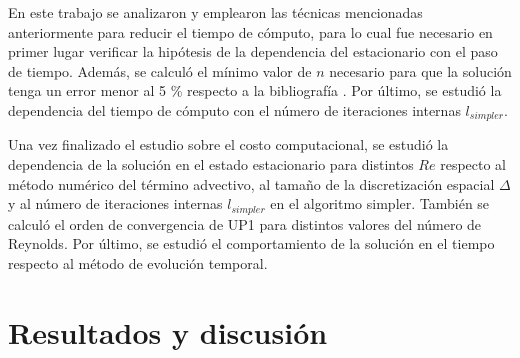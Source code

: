 \documentclass[aps,prb,twocolumn,superscriptaddress,floatfix,longbibliography,10pt]{revtex4-2}
\newif\ifptitle
\newif\ifpnumber
\newcounter{para}
\newcommand\ptitle[1]{\par\refstepcounter{para}
{\ifpnumber{\noindent\textcolor{lightgray}{\textbf{\thepara}}\indent}\fi}
{\ifptitle{\textbf{[{#1}]}}\fi}}
\begin{document}




\ptitle{Resumen de lo que se va a estudiar}

En este trabajo se analizaron y emplearon las técnicas mencionadas anteriormente para reducir el tiempo de cómputo, para lo cual fue necesario en primer lugar verificar la hipótesis de la dependencia del estacionario con el paso de tiempo. Además, se calculó el mínimo valor de $n$ necesario para que la solución tenga un error menor al 5 \% respecto a la bibliografía \cite{Guia1982}. Por último, se estudió la dependencia del tiempo de cómputo con el número de iteraciones internas $l_{simpler}$.

Una vez finalizado el estudio sobre el costo computacional, se estudió la dependencia de la solución en el estado estacionario para distintos $Re$ respecto al método numérico del término advectivo, al tamaño de la discretización espacial $\Delta$ y al número de iteraciones internas $l_{simpler}$ en el algoritmo simpler. También se calculó el orden de convergencia de UP1 para distintos valores del número de Reynolds. Por último, se estudió el comportamiento de la solución en el tiempo respecto al método de evolución temporal. 

\section{Resultados y discusión}
\end{document}
